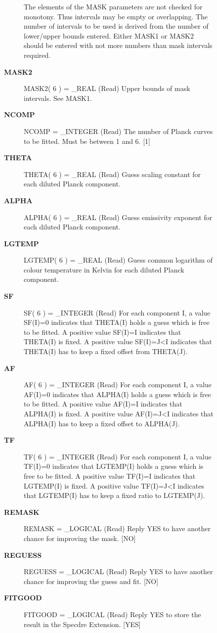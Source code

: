\begin{description}
\begin{description}
\begin{description}
   The elements of the MASK parameters are not checked for
   monotony. Thus intervals may be empty or overlapping. The
   number of intervals to be used is derived from the number of
   lower/upper bounds entered. Either MASK1 or MASK2 should be
   entered with not more numbers than mask intervals required.
\item [\textbf{MASK2}]
MASK2( 6 ) = \_REAL (Read)
   Upper bounds of mask intervals. See MASK1.
\item [\textbf{NCOMP}]
NCOMP = \_INTEGER (Read)
   The number of Planck curves to be fitted. Must be between 1
   and 6. [1]
\item [\textbf{THETA}]
THETA( 6 ) = \_REAL (Read)
   Guess scaling constant for each diluted Planck component.
\item [\textbf{ALPHA}]
ALPHA( 6 ) = \_REAL (Read)
   Guess emissivity exponent for each diluted Planck component.
\item [\textbf{LGTEMP}]
LGTEMP( 6 ) = \_REAL (Read)
   Guess common logarithm of colour temperature in Kelvin for
   each diluted Planck component.
\item [\textbf{SF}]
SF( 6 ) = \_INTEGER (Read)
   For each component I, a value SF(I)=0 indicates that
   THETA(I) holds a guess which is free to be fitted.
   A positive value SF(I)=I indicates that THETA(I) is fixed.
   A positive value SF(I)=J<I indicates that THETA(I) has to
   keep a fixed offset from THETA(J).
\item [\textbf{AF}]
AF( 6 ) = \_INTEGER (Read)
   For each component I, a value AF(I)=0 indicates that
   ALPHA(I) holds a guess which is free to be fitted.
   A positive value AF(I)=I indicates that ALPHA(I) is fixed.
   A positive value AF(I)=J<I indicates that ALPHA(I) has to
   keep a fixed offset to ALPHA(J).
\item [\textbf{TF}]
TF( 6 ) = \_INTEGER (Read)
   For each component I, a value TF(I)=0 indicates that
   LGTEMP(I) holds a guess which is free to be fitted.
   A positive value TF(I)=I indicates that LGTEMP(I) is fixed.
   A positive value TF(I)=J<I indicates that LGTEMP(I) has to
   keep a fixed ratio to LGTEMP(J).
\item [\textbf{REMASK}]
REMASK = \_LOGICAL (Read)
   Reply YES to have another chance for improving the mask.
   [NO]
\item [\textbf{REGUESS}]
REGUESS = \_LOGICAL (Read)
   Reply YES to have another chance for improving the guess and
   fit. [NO]
\item [\textbf{FITGOOD}]
FITGOOD = \_LOGICAL (Read)
   Reply YES to store the result in the Specdre Extension. [YES]

\end{description}
\end{description}
\end{description}
